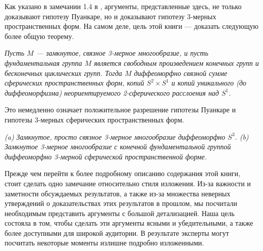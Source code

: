 Как указано в замечании 1.4 в \cite{c54}, аргументы, представленные здесь, не только 
доказывают гипотезу Пуанкаре, но и доказывают гипотезу 3-мерных пространственных 
форм. На самом деле, цель этой книги — доказать следующую более общую теорему.

\begin{theorem} \textit{Пусть $M$ — замкнутое, связное 3-мерное многообразие, 
и пусть фундаментальная группа $M$ является свободным произведением конечных 
групп и бесконечных циклических групп. Тогда $M$ диффеоморфно связной сумме 
сферических пространственных форм, копий $S^{2}\times S^{1}$ и копий 
уникального (до диффеоморфизма) неориентируемого 2-сферического расслоения над 
$S^{1}$.}
\end{theorem}

Это немедленно означает положительное разрешение гипотезы Пуанкаре и гипотезы 
3-мерных сферических пространственных форм.

\begin{corollary} \textit{
(a) Замкнутое, просто связное 3-мерное многообразие диффеоморфно $S^{3}$.
(b) Замкнутое 3-мерное многообразие с конечной фундаментальной группой диффеоморфно 
3-мерной сферической пространственной форме.}
\end{corollary}

Прежде чем перейти к более подробному описанию содержания этой книги, стоит 
сделать одно замечание относительно стиля изложения. Из-за важности и 
заметности обсуждаемых результатов, а также из-за множества неверных утверждений 
о доказательствах этих результатов в прошлом, мы посчитали необходимым 
представить аргументы с большой детализацией. Наша цель состояла в том, чтобы 
сделать эти аргументы ясными и убедительными, а также более доступными для 
широкой аудитории. В результате эксперты могут посчитать некоторые моменты 
излишне подробно изложенными.











